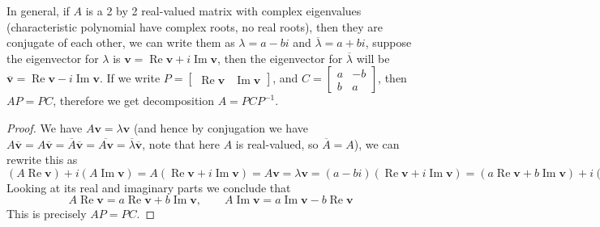 \documentclass{beamer}
\theoremstyle{definition}
\theoremstyle{remark}
\begin{document}
\begin{frame}[t]
\begin{theorem}
In general, if $A$ is a 2 by 2 real-valued matrix with complex eigenvalues (characteristic polynomial have complex roots, no real roots), then they are conjugate of each other, we can write them as $\lambda=a-bi$ and $\overline\lambda=a+bi$\pause, suppose the eigenvector for $\lambda$ is $\mathbf v=\operatorname{Re}\mathbf v+i\operatorname{Im}\mathbf v$, then the eigenvector for $\overline\lambda$ will be $\overline{\mathbf v}=\operatorname{Re}\mathbf v-i\operatorname{Im}\mathbf v$\pause. If we write $P=\begin{bmatrix}
\operatorname{Re}\mathbf v&\operatorname{Im}\mathbf v
\end{bmatrix}$, and $C=\begin{bmatrix}
a&-b\\
b&a
\end{bmatrix}$, then $AP=PC$, therefore we get decomposition $A=PCP^{-1}$.
\end{theorem}
\end{frame}

\begin{frame}[t]
\begin{proof}
We have $A\mathbf v=\lambda\mathbf v$ (and hence by conjugation we have $A\overline{\mathbf v}=A\overline{\mathbf v}=\overline A\overline{\mathbf v}=\overline{A\mathbf v}=\overline{\lambda}\overline{\mathbf v}$, note that here $A$ is real-valued, so $\overline A=A$), we can rewrite this as
$
(A\operatorname{Re}\mathbf v)+i(A\operatorname{Im}\mathbf v)=A(\operatorname{Re}\mathbf v+i\operatorname{Im}\mathbf v)=A\mathbf v=\lambda\mathbf v=(a-bi)(\operatorname{Re}\mathbf v+i\operatorname{Im}\mathbf v)=(a\operatorname{Re}\mathbf v+b\operatorname{Im}\mathbf v)+i(a\operatorname{Im}\mathbf v-b\operatorname{Re}\mathbf v)
$\\
\pause
Looking at its real and imaginary parts we conclude that
\[
A\operatorname{Re}\mathbf v=a\operatorname{Re}\mathbf v+b\operatorname{Im}\mathbf v,\qquad A\operatorname{Im}\mathbf v=a\operatorname{Im}\mathbf v-b\operatorname{Re}\mathbf v
\]\pause
This is precisely $AP=PC$.
\end{proof}
\end{frame}
\end{document}
